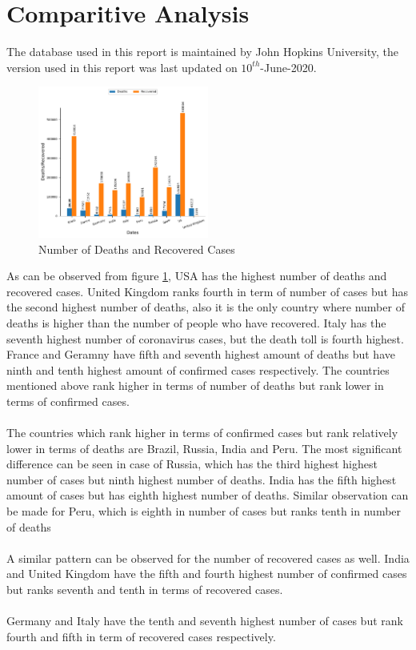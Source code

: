 \documentclass[12pt, twosided]{report}  %
\begin{document}
\section{Comparitive Analysis}
The database used in this report is maintained by John Hopkins University, the version used in this report was last updated on $10^{th}$-June-2020.
\begin{figure}[H]
	\centering
	\includegraphics[width=0.5\textwidth]{./images/plot_1.pdf}
	\caption{Number of Deaths and Recovered Cases}
	\label{plot_deathrecovered}
\end{figure}

As can be observed from figure \ref{plot_deathrecovered}, USA has the highest number of deaths and recovered cases. United Kingdom ranks fourth in term of number of cases but has the second highest number of deaths, also it is the only country where number of deaths is higher than the number of people who have recovered. Italy has the seventh highest number of coronavirus cases, but the death toll is fourth highest. France and Geramny have fifth and seventh highest amount of deaths but have ninth and tenth highest amount of confirmed cases respectively. The countries mentioned above rank higher in terms of number of deaths but rank lower in terms of confirmed cases.
\\
\\
The countries which rank higher in terms of confirmed cases but rank relatively lower in terms of  deaths are Brazil, Russia, India and Peru. The most significant difference can be seen in case of Russia, which has the third highest highest number of cases but ninth highest number of deaths. India has the fifth highest amount of cases but has eighth highest number of deaths. Similar observation can be made for Peru, which is eighth in number of cases but ranks tenth in number of deaths
\\
\\
A similar pattern can be observed for the number of recovered cases as well. India and United Kingdom have the fifth and fourth highest number of confirmed cases but ranks seventh and tenth in terms of recovered cases.
\\
\\
Germany and Italy have the tenth and seventh highest number of cases but rank fourth and fifth in term of recovered cases respectively.
\end{document}
